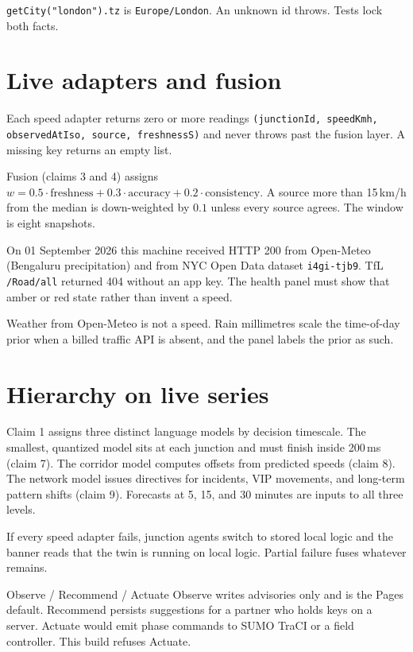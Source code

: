 \documentclass[listings]{csf301-notes}
\begin{document}
\begin{example}
\texttt{getCity("london").tz} is \texttt{Europe/London}. An unknown id
throws. Tests lock both facts.
\end{example}

\section{Live adapters and fusion}
Each speed adapter returns zero or more readings
\texttt{(junctionId, speedKmh, observedAtIso, source, freshnessS)} and never
throws past the fusion layer. A missing key returns an empty list.

Fusion (claims 3 and 4) assigns
$w = 0.5\cdot\mathrm{freshness} + 0.3\cdot\mathrm{accuracy} + 0.2\cdot\mathrm{consistency}$.
A source more than 15\,km/h from the median is down-weighted by $0.1$ unless
every source agrees. The window is eight snapshots.

\begin{implnote}
On 01 September 2026 this machine received HTTP 200 from Open-Meteo
(Bengaluru precipitation) and from NYC Open Data dataset \texttt{i4gi-tjb9}.
TfL \texttt{/Road/all} returned 404 without an app key. The health panel
must show that amber or red state rather than invent a speed.
\end{implnote}

Weather from Open-Meteo is not a speed. Rain millimetres scale the
time-of-day prior when a billed traffic API is absent, and the panel labels
the prior as such.

\section{Hierarchy on live series}
Claim 1 assigns three distinct language models by decision timescale. The
smallest, quantized model sits at each junction and must finish inside
200\,ms (claim 7). The corridor model computes offsets from predicted
speeds (claim 8). The network model issues directives for incidents, VIP
movements, and long-term pattern shifts (claim 9). Forecasts at 5, 15, and
30 minutes are inputs to all three levels.

If every speed adapter fails, junction agents switch to stored local logic
and the banner reads that the twin is running on local logic. Partial
failure fuses whatever remains.

\begin{langbox}{Observe / Recommend / Actuate}
Observe writes advisories only and is the Pages default.
Recommend persists suggestions for a partner who holds keys on a server.
Actuate would emit phase commands to SUMO TraCI or a field controller. This
build refuses Actuate.
\end{langbox}
\end{document}
